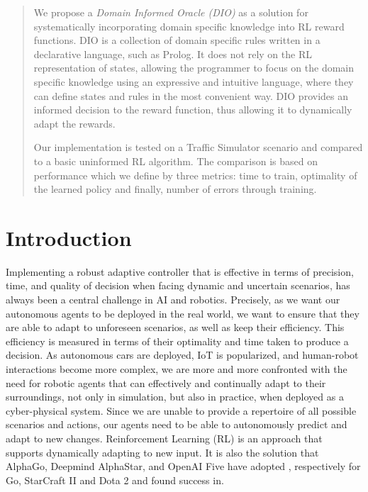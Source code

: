 \documentclass[a4paper,11pt]{article}
\theoremstyle{definition}
\begin{document}
\begin{abstract}

  We propose a \emph{Domain Informed Oracle (DIO)} as a solution for
  systematically incorporating domain specific knowledge into RL
  reward functions.
  DIO is a collection of domain specific rules written in a
  declarative language, such as Prolog.
  It does not rely on the RL representation of states, allowing the
  programmer to focus on the domain specific knowledge using an
  expressive and intuitive language, where they can define states and
  rules in the most convenient way.
  DIO provides an informed decision to the reward function, thus
  allowing it to dynamically adapt the rewards. 
  
  Our implementation is tested on a Traffic Simulator scenario and
  compared to a basic uninformed RL algorithm. 
  The comparison is based on performance which we define by three
  metrics: time to train, optimality of the learned policy and
  finally, number of errors through training. 
  
\end{abstract}



\section{Introduction}

Implementing a robust adaptive controller that is effective in terms
of precision, time, and quality of decision
when facing dynamic and uncertain scenarios, has always been a central
challenge in AI and robotics. Precisely, as we want our autonomous agents to be deployed 
in the real world, we want to ensure that they are able to adapt to unforeseen scenarios, as well as 
keep their efficiency. This efficiency is measured in terms of their optimality and time taken to produce a decision. 
%
As autonomous cars are deployed, IoT is popularized, and human-robot interactions become more complex, we
are more and more confronted with the need for robotic agents that can effectively and continually adapt
to their surroundings, not only in simulation, but also in practice, when deployed as a cyber-physical system. 
Since we are unable to provide a repertoire of all possible scenarios and actions,
our agents need to be able to autonomously predict and adapt to new
changes. Reinforcement Learning (RL) is an approach that
supports dynamically adapting to new input. It is also the solution that AlphaGo, Deepmind AlphaStar, and OpenAI Five have
adopted \cite{li2019reinforcement}, respectively for Go, StarCraft II and Dota 2 and found success in. 
\end{document}
